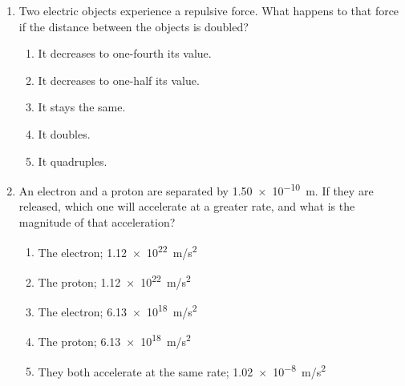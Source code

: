 \documentclass{../../../oss-apphys}
\begin{document}
\genheader


\genmultidirections

\raggedcolumns
\begin{multicols}{2}  
  \begin{enumerate}[leftmargin=18pt]

  \item Two electric objects experience a repulsive force. What happens to that
    force if the distance between the objects is doubled?
    \begin{enumerate}[nosep,leftmargin=18pt,label=(\Alph*)]
    \item It decreases to one-fourth its value.
    \item It decreases to one-half its value.
    \item It stays the same.
    \item It doubles.
    \item It quadruples.
    \end{enumerate}

  \item An electron and a proton are separated by \SI{1.50e-10}{\metre}. If
    they are released, which one will accelerate at a greater rate, and what is
    the magnitude of that acceleration?
    \begin{enumerate}[nosep,leftmargin=18pt,label=(\Alph*)]
    \item The electron; \SI{1.12e22}{m/s^2}
    \item The proton; \SI{1.12e22}{m/s^2}
    \item The electron; \SI{6.13e18}{m/s^2}
    \item The proton; \SI{6.13e18}{m/s^2}
    \item They both accelerate at the same rate; \SI{1.02e-8}{m/s^2}
    \end{enumerate}
    

\end{enumerate}
\end{multicols}
\end{document}
